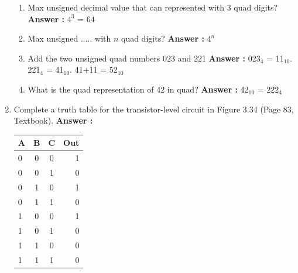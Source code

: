 \documentclass[a4paper,11pt]{article}
\begin{document}
\begin{enumerate}
  \begin{enumerate}
  \item Max unsigned decimal value that can represented with 3 quad digits? \textbf{Answer :} $4^3$ = $64$
  \item Max unsigned ..... with $n$ quad digits? \textbf{Answer :} $4^n$
  \item Add the two unsigned quad numbers 023 and 221 \textbf{Answer :} 023$_4$ = 11$_{10}$. 221$_4$ = 41$_{10}$. 41+11 = 52$_{10}$
  \item What is the quad representation of 42 in quad? \textbf{Answer :} 42$_{10}$ = 222$_4$
  \end{enumerate}

\item Complete a truth table for the transistor-level circuit in Figure 3.34 (Page 83, Textbook).
\textbf{Answer :} 
\begin{tabular}{ l | c | c | r }
  A & B & C & Out \\
  \hline 
  0 & 0 & 0 & 1 \\
  \hline
  0 & 0 & 1 & 0 \\
  \hline 
  0 & 1 & 0 & 1 \\
  \hline
  0 & 1 & 1 & 0 \\
  \hline 
  1 & 0 & 0 & 1 \\
  \hline
  1 & 0 & 1 & 0 \\
  \hline 
  1 & 1 & 0 & 0 \\
  \hline 
  1 & 1 & 1 & 0 \\
\end{tabular}


\end{enumerate}
\end{document}
